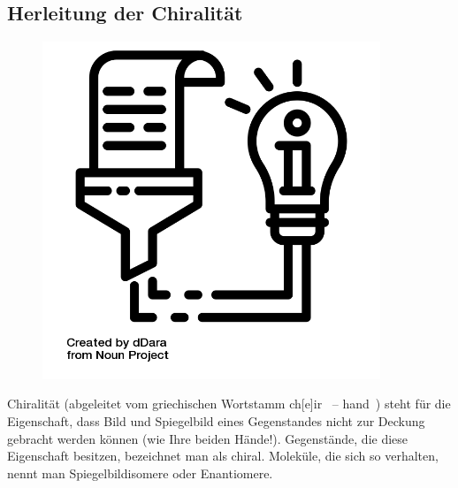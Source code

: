 \documentclass{scrartcl}  %
\begin{document}
		\subsection{Herleitung der Chiralität}	
			\begin{tcolorbox}[enhanced,
				colback=white,
				colframe=darkgray,
				fonttitle=\sffamily\bfseries\large, 
				title=Enantiomere,  %
				attach boxed title to top left={xshift=3.2mm,yshift=-0.50mm},
				boxed title style={skin=enhancedfirst jigsaw,size=small,arc=1mm,bottom=-1mm,colframe=darkgray,height=0.75cm},
				colbacktitle=darkgray,
				drop lifted shadow]
				\begin{figure}  
					\centering
					\vspace{-14pt}  %
					\includegraphics[width=0.9\textwidth]{symbols/symbol_tex_content}
				\end{figure}
				
				Chiralität (abgeleitet vom griechischen Wortstamm ch[e]ir~ – hand~) steht für die Eigenschaft, dass Bild und Spiegelbild eines Gegenstandes nicht zur Deckung gebracht werden können (wie Ihre beiden Hände!). Gegenstände, die diese Eigenschaft besitzen, bezeichnet man als chiral. \newline
				Moleküle, die sich so verhalten, nennt man Spiegelbildisomere oder Enantiomere. 
				
			\end{tcolorbox}				
			
\end{document}
